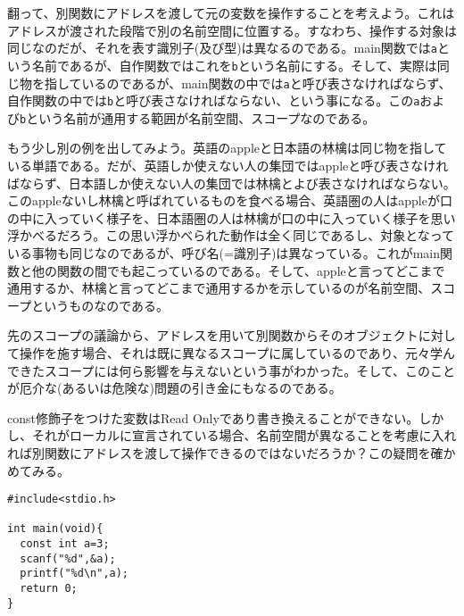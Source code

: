 翻って、別関数にアドレスを渡して元の変数を操作することを考えよう。これはアドレスが渡された段階で別の名前空間に位置する。すなわち、操作する対象は同じなのだが、それを表す識別子(及び型)は異なるのである。main関数では\verb|a|という名前であるが、自作関数ではこれを\verb|b|という名前にする。そして、実際は同じ物を指しているのであるが、main関数の中では\verb|a|と呼び表さなければならず、自作関数の中では\verb|b|と呼び表さなければならない、という事になる。この\verb|a|および\verb|b|という名前が通用する範囲が名前空間、スコープなのである。

もう少し別の例を出してみよう。英語のappleと日本語の林檎は同じ物を指している単語である。だが、英語しか使えない人の集団ではappleと呼び表さなければならず、日本語しか使えない人の集団では林檎とよび表さなければならない。このappleないし林檎と呼ばれているものを食べる場合、英語圏の人はappleが口の中に入っていく様子を、日本語圏の人は林檎が口の中に入っていく様子を思い浮かべるだろう。この思い浮かべられた動作は全く同じであるし、対象となっている事物も同じなのであるが、呼び名(=識別子)は異なっている。これがmain関数と他の関数の間でも起こっているのである。そして、appleと言ってどこまで通用するか、林檎と言ってどこまで通用するかを示しているのが名前空間、スコープというものなのである。

先のスコープの議論から、アドレスを用いて別関数からそのオブジェクトに対して操作を施す場合、それは既に異なるスコープに属しているのであり、元々学んできたスコープには何ら影響を与えないという事がわかった。そして、このことが厄介な(あるいは危険な)問題の引き金にもなるのである。
\begin{boxnote}
\begin{multicols}{2}
const修飾子をつけた変数はRead Onlyであり書き換えることができない。しかし、それがローカルに宣言されている場合、名前空間が異なることを考慮に入れれば別関数にアドレスを渡して操作できるのではないだろうか？この疑問を確かめてみる。
\begin{lstlisting}[caption=const修飾子付き変数への入力,label=program10_2]
#include<stdio.h>

int main(void){
  const int a=3;
  scanf("%d",&a);
  printf("%d\n",a);
  return 0;
}
\end{lstlisting}
\end{multicols}
\end{boxnote}

